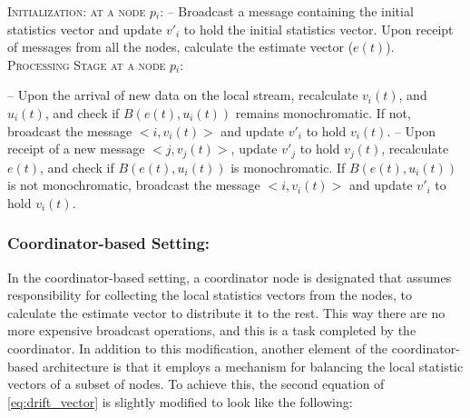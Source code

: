 \begin{algorithm}
    \caption{The Decentralized Algorithm of the Geometric Approach}
    \begin{algorithmic}
        \State \textsc{Initialization: at a node $p_i$:}
        \State \hspace{1em} -- Broadcast a message containing the initial statistics vector and update $v'_i$
        \State \hspace{1.8em} to hold the initial statistics vector. Upon receipt of messages from all the
        \State \hspace{1.8em} nodes, calculate the estimate vector ($e(t)$). \\
        \State \textsc{Processing Stage at a node $p_i$:}

        \State \hspace{1em} -- Upon the arrival of new data on the local stream, recalculate $v_i(t)$, and $u_i(t)$,
        \State \hspace{1.8em} and check if $B(e(t), u_i(t))$ remains monochromatic. If not, broadcast the
        \State \hspace{1.8em} message $<i, v_i(t)>$ and update $v'_i$ to hold $v_i(t)$.
        \State \hspace{1em} -- Upon receipt of a new message $<j, v_j(t)>$, update $v'_j$ to hold $v_j(t)$,
        \State \hspace{1.8em} recalculate $e(t)$, and check if $B(e(t), u_i(t))$ is monochromatic. If
        \State \hspace{1.8em} $B(e(t), u_i(t))$ is not monochromatic, broadcast the message $<i, v_i(t)>$
        \State \hspace{1.8em} and update $v'_i$ to hold $v_i(t)$.
    \end{algorithmic}
    \label{alg:decentralized_gm}
\end{algorithm}


\subsubsection{Coordinator-based Setting:} \label{sec:coordinator_based}
In the coordinator-based setting, a coordinator node is designated that assumes responsibility for
collecting the local statistics vectors from the nodes, to calculate the estimate vector to distribute it to the rest.
This way there are no more expensive broadcast operations, and this is a task completed by the coordinator. In addition to this modification,
another element of the coordinator-based architecture is that it employs a mechanism for balancing the local statistic vectors of a
subset of nodes. To achieve this, the second equation of \cref{eq:drift_vector} is slightly modified to look like the following:


